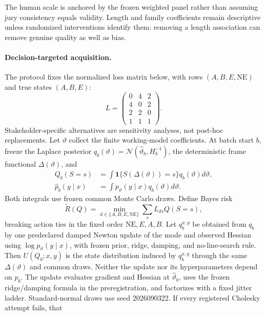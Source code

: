 \documentclass{article}
\begin{document}
The human scale is anchored by the frozen weighted panel rather than assuming
jury consistency equals validity. Length and family coefficients remain
descriptive unless randomized interventions identify them: removing a length
association can remove genuine quality as well as bias.

\paragraph{Decision-targeted acquisition.}
The protocol fixes the normalized loss matrix below, with rows
$(A,B,E,\mathrm{NE})$ and true states $(A,B,E)$:
\begin{equation}
L=\begin{pmatrix}
0&4&2\\4&0&2\\2&2&0\\1&1&1
\end{pmatrix}.
\label{eq:loss}
\end{equation}
Stakeholder-specific alternatives are sensitivity analyses, not post-hoc
replacements. Let $\vartheta$ collect the finite working-model coefficients.
At batch start $b$, freeze the Laplace posterior
$q_b(\vartheta)=\mathcal N(\widehat\vartheta_b,H_b^{-1})$, the deterministic
frame functional $\Delta(\vartheta)$, and
\begin{align}
Q_b(S=s)&=\int\mathbf 1\{S(\Delta(\vartheta))=s\}
q_b(\vartheta)d\vartheta,\\
\widehat p_b(y\mid x)&=\int p_\vartheta(y\mid x)q_b(\vartheta)d\vartheta.
\end{align}
Both integrals use frozen common Monte Carlo draws. Define Bayes risk
\begin{equation}
\widetilde R(Q)=
\min_{d\in\{A,B,E,\mathrm{NE}\}}
\sum_s L_{ds}Q(S=s),
\end{equation}
breaking action ties in the fixed order $\mathrm{NE},E,A,B$. Let
$q_b^{x,y}$ be obtained from $q_b$ by one predeclared damped Newton update of
the mode and observed Hessian using $\log p_\vartheta(y\mid x)$, with frozen
prior, ridge, damping, and no-line-search rule. Then $U(Q_b;x,y)$ is the state
distribution induced by $q_b^{x,y}$ through the same
$\Delta(\vartheta)$ and common draws. Neither the update nor its
hyperparameters depend on $p_b$. The update evaluates gradient and Hessian at
$\widehat\vartheta_b$, uses the frozen ridge/damping formula in the
preregistration, and factorizes with a fixed jitter ladder. Standard-normal
draws use seed 2026090322. If every registered Cholesky attempt fails, that
\end{document}
